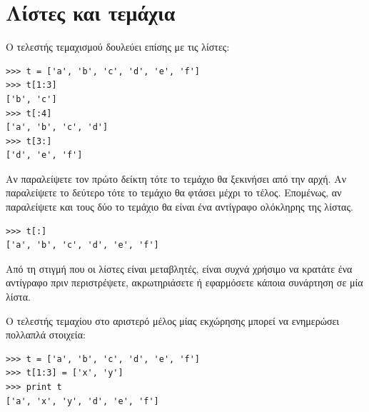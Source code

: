 \documentclass[10pt]{book}
\begin{document}
\section{Λίστες και τεμάχια}

Ο τελεστής τεμαχισμού δουλεύει επίσης με τις λίστες:

\begin{verbatim}
>>> t = ['a', 'b', 'c', 'd', 'e', 'f']
>>> t[1:3]
['b', 'c']
>>> t[:4]
['a', 'b', 'c', 'd']
>>> t[3:]
['d', 'e', 'f']
\end{verbatim}
%

Αν παραλείψετε τον πρώτο δείκτη τότε το τεμάχιο θα ξεκινήσει από την αρχή.
Αν παραλείψετε το δεύτερο τότε το τεμάχιο θα φτάσει μέχρι το τέλος. Επομένως, αν παραλείψετε και τους δύο το τεμάχιο θα είναι ένα αντίγραφο ολόκληρης της λίστας.

\begin{verbatim}
>>> t[:]
['a', 'b', 'c', 'd', 'e', 'f']
\end{verbatim}
%

Από τη στιγμή που οι λίστες είναι μεταβλητές, είναι συχνά χρήσιμο να κρατάτε ένα αντίγραφο πριν περιστρέψετε, ακρωτηριάσετε ή εφαρμόσετε κάποια συνάρτηση σε μία λίστα.

Ο τελεστής τεμαχίου στο αριστερό μέλος μίας εκχώρησης μπορεί να ενημερώσει πολλαπλά στοιχεία:

\begin{verbatim}
>>> t = ['a', 'b', 'c', 'd', 'e', 'f']
>>> t[1:3] = ['x', 'y']
>>> print t
['a', 'x', 'y', 'd', 'e', 'f']
\end{verbatim}
%


%

%
\end{document}

